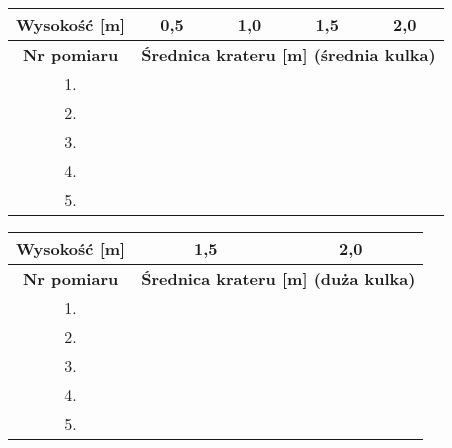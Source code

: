 \documentclass[a4paper,12pt]{article}
\begin{document}
\begin{table}[h]
    \renewcommand{\arraystretch}{1.3}
    \setlength{\tabcolsep}{25pt}
    \begin{tabular}{|c|c|c|c|c|}
        \hline
        \textbf{Wysokość [m]} & 0,5 & 1,0 & 1,5 & 2,0 \\
        \hline
        \hline
        \textbf{Nr pomiaru} & \multicolumn{4}{c|}{\textbf{Średnica krateru [m] (średnia kulka)}} \\
        \hline
        1. & & & & \\
        \hline
        2. & & & & \\
        \hline
        3. & & & & \\
        \hline
        4. & & & & \\
        \hline
        5. & & & & \\
        \hline
    \end{tabular}
    \label{tab:srednia_kulka}
\end{table}


\begin{table}[h]
    \renewcommand{\arraystretch}{1.3}
    \setlength{\tabcolsep}{25pt}
    \begin{tabular}{|c|c|c|}
        \hline
        \textbf{Wysokość [m]} & 1,5 & 2,0 \\
        \hline
        \hline
        \textbf{Nr pomiaru} & \multicolumn{2}{c|}{\textbf{Średnica krateru [m] (duża kulka) }} \\
        \hline
        1. & & \\
        \hline
        2. & & \\
        \hline
        3. & & \\
        \hline
        4. & & \\
        \hline
        5. & & \\
        \hline
    \end{tabular}
    \label{tab:duza_kulka}
\end{table}
\end{document}
